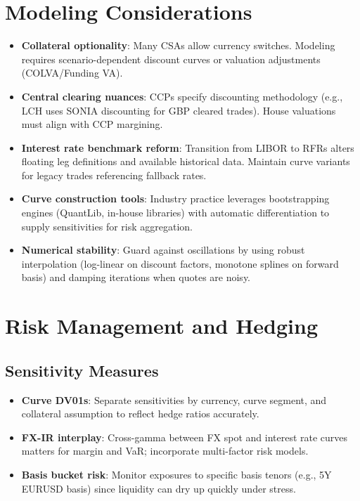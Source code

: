 \documentclass[11pt]{article}
\begin{document}
\section{Modeling Considerations}
\begin{itemize}[leftmargin=*]
  \item \textbf{Collateral optionality}: Many CSAs allow currency switches. Modeling requires scenario-dependent discount curves or valuation adjustments (COLVA/Funding VA).
  \item \textbf{Central clearing nuances}: CCPs specify discounting methodology (e.g., LCH uses SONIA discounting for GBP cleared trades). House valuations must align with CCP margining.
  \item \textbf{Interest rate benchmark reform}: Transition from LIBOR to RFRs alters floating leg definitions and available historical data. Maintain curve variants for legacy trades referencing fallback rates.
  \item \textbf{Curve construction tools}: Industry practice leverages bootstrapping engines (QuantLib, in-house libraries) with automatic differentiation to supply sensitivities for risk aggregation.
  \item \textbf{Numerical stability}: Guard against oscillations by using robust interpolation (log-linear on discount factors, monotone splines on forward basis) and damping iterations when quotes are noisy.
\end{itemize}

\section{Risk Management and Hedging}
\subsection{Sensitivity Measures}
\begin{itemize}[leftmargin=*]
  \item \textbf{Curve DV01s}: Separate sensitivities by currency, curve segment, and collateral assumption to reflect hedge ratios accurately.
  \item \textbf{FX-IR interplay}: Cross-gamma between FX spot and interest rate curves matters for margin and VaR; incorporate multi-factor risk models.
  \item \textbf{Basis bucket risk}: Monitor exposures to specific basis tenors (e.g., 5Y EURUSD basis) since liquidity can dry up quickly under stress.
\end{itemize}
\end{document}
